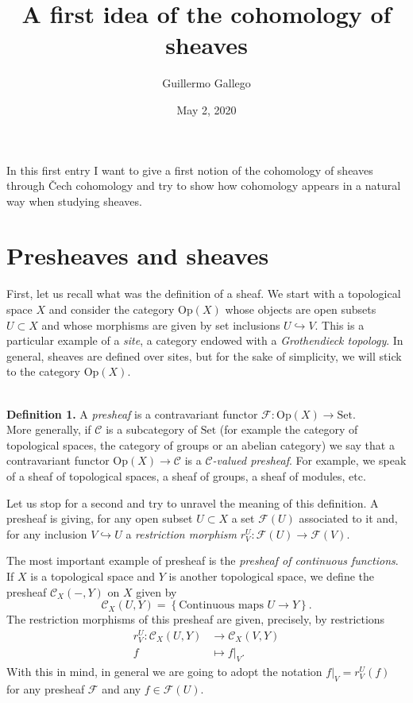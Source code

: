 \documentclass[12pt,a4paper]{article}
\author{Guillermo Gallego}
\title{A first idea of the cohomology of sheaves}
\date{May 2, 2020}
\begin{document}
\maketitle

In this first entry I want to give a first notion of the cohomology of sheaves through \v{C}ech cohomology and try to show how cohomology appears in a natural way when studying sheaves. 

\section*{Presheaves and sheaves}
First, let us recall what was the definition of a sheaf. We start with a topological space $X$ and consider the category $\mathrm{Op}(X)$ whose objects are open subsets $U\subset X$ and whose morphisms are given by set inclusions $U\hookrightarrow V$. This is a particular example of a \emph{site}, a category endowed with a \emph{Grothendieck topology}. In general, sheaves are defined over sites, but for the sake of simplicity, we will stick to the category $\mathrm{Op}(X)$.

\ \\ 
\textbf{Definition 1.} A \emph{presheaf} is a contravariant functor $\mathcal{F}:\mathrm{Op}(X) \rightarrow \mathrm{Set}$. \\

More generally, if $\mathcal{C}$ is a subcategory of $\mathrm{Set}$ (for example the category of topological spaces, the category of groups or an abelian category) we say that a contravariant functor $\mathrm{Op}(X) \rightarrow \mathcal{C}$ is a \emph{$\mathcal{C}$-valued presheaf}. For example, we speak of a sheaf of topological spaces, a sheaf of groups, a sheaf of modules, etc. 

Let us stop for a second and try to unravel the meaning of this definition. A presheaf is giving, for any open subset $U\subset X$ a set $\mathcal{F}(U)$ associated to it and, for any inclusion $V\hookrightarrow U$ a \emph{restriction morphism} $r^U_V: \mathcal{F}(U) \rightarrow \mathcal{F}(V)$.

The most important example of presheaf is the \emph{presheaf of continuous functions}. If $X$ is a topological space and $Y$ is another topological space, we define the presheaf $\mathcal{C}_X(-,Y)$ on $X$ given by
\begin{equation*}
  \mathcal{C}_X (U,Y) = \left\{ \text{Continuous maps } U\rightarrow Y \right\}.
\end{equation*}
The restriction morphisms of this presheaf are given, precisely, by restrictions
\begin{align*}
  r^U_V :\mathcal{C}_X(U,Y)&\longrightarrow \mathcal{C}_X(V,Y)\\ 
    f &\longmapsto f|_V. 
  \end{align*}
  With this in mind, in general we are going to adopt the notation $f|_V=r^U_V(f)$ for any presheaf $\mathcal{F}$ and any $f\in \mathcal{F}(U)$.
\end{document}
